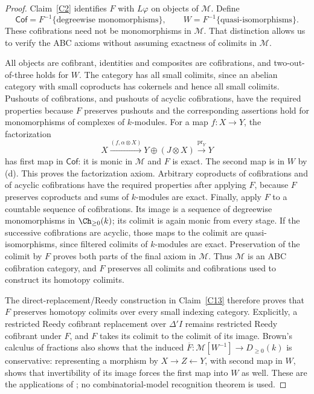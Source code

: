 \begin{proof}
Claim~\ref{C2} identifies $F$ with $L\varphi$ on objects of $\mathcal M$. Define
\[
 \mathsf{Cof}=F^{-1}\{\text{degreewise monomorphisms}\},
 \qquad W=F^{-1}\{\text{quasi-isomorphisms}\}.
\]
These cofibrations need not be monomorphisms in $\mathcal M$. That distinction allows us to verify the ABC axioms without assuming exactness of colimits in $\mathcal M$.

All objects are cofibrant, identities and composites are cofibrations, and two-out-of-three holds for $W$. The category has all small colimits, since an abelian category with small coproducts has cokernels and hence all small colimits. Pushouts of cofibrations, and pushouts of acyclic cofibrations, have the required properties because $F$ preserves pushouts and the corresponding assertions hold for monomorphisms of complexes of $k$-modules. For a map $f:X\to Y$, the factorization
\[
 X\xrightarrow{(f,\alpha\otimes X)}Y\oplus(J\otimes X)
 \xrightarrow{\mathrm{pr}_Y}Y
\]
has first map in $\mathsf{Cof}$: it is monic in $\mathcal M$ and $F$ is exact. The second map is in $W$ by (d). This proves the factorization axiom. Arbitrary coproducts of cofibrations and of acyclic cofibrations have the required properties after applying $F$, because $F$ preserves coproducts and sums of $k$-modules are exact. Finally, apply $F$ to a countable sequence of cofibrations. Its image is a sequence of degreewise monomorphisms in $\Ch_{\geq0}(k)$; its colimit is again monic from every stage. If the successive cofibrations are acyclic, those maps to the colimit are quasi-isomorphisms, since filtered colimits of $k$-modules are exact. Preservation of the colimit by $F$ proves both parts of the final axiom in $\mathcal M$. Thus $\mathcal M$ is an ABC cofibration category, and $F$ preserves all colimits and cofibrations used to construct its homotopy colimits.

The direct-replacement/Reedy construction in Claim~\ref{C13} therefore proves that $F$ preserves homotopy colimits over every small indexing category. Explicitly, a restricted Reedy cofibrant replacement over $\Delta'I$ remains restricted Reedy cofibrant under $F$, and $F$ takes its colimit to the colimit of its image. Brown's calculus of fractions also shows that the induced $\overline F:\mathcal M[W^{-1}]\to D_{\geq0}(k)$ is conservative: representing a morphism by $X\to Z\leftarrow Y$, with second map in $W$, shows that invertibility of its image forces the first map into $W$ as well. These are the applications of \citet[Theorems 6.4.4 and 9.6.3]{RadulescuBanu2009}; no combinatorial-model recognition theorem is used.


\end{proof}
